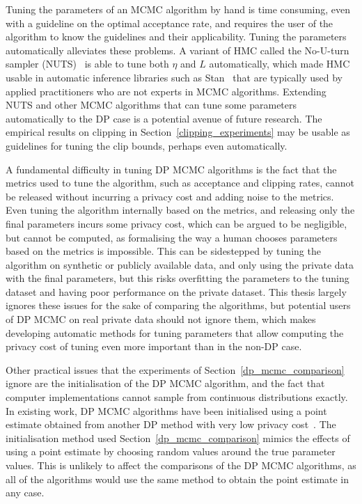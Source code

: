 \documentclass[english,twoside,openright]{HYgraduMLDS}
\begin{document}
Tuning the parameters of an MCMC algorithm by hand is time consuming,
even with a guideline on the optimal acceptance rate, and requires the user of
the algorithm to know the guidelines and their applicability. Tuning the
parameters automatically alleviates these problems. A variant of HMC called
the No-U-turn sampler (NUTS)~\cite{HoG14} is able to tune both \(\eta\) and \(L\)
automatically, which made HMC usable in automatic inference libraries such as
Stan~\cite{stan} that are typically used by applied practitioners who are not
experts in MCMC algorithms. Extending NUTS and other MCMC algorithms that
can tune some parameters automatically to the DP case is a potential avenue of
future research. The empirical results on clipping in
Section~\ref{clipping_experiments} may be usable as guidelines for tuning the
clip bounds, perhaps even automatically.

A fundamental difficulty in tuning DP MCMC algorithms is the fact that the
metrics used to tune the algorithm, such as acceptance and clipping rates,
cannot be released without incurring a privacy cost and adding noise to the
metrics. Even tuning the algorithm
internally based on the metrics, and releasing only the final parameters incurs
some privacy cost, which can be argued to be negligible, but cannot be
computed, as formalising the way a human chooses parameters based on the metrics
is impossible. This can be sidestepped by tuning the algorithm on synthetic or
publicly available data, and only using the private data with the final parameters,
but this risks overfitting the parameters to the tuning dataset and having
poor performance on the private dataset.
This thesis largely ignores these issues for the sake of comparing
the algorithms, but potential users of DP MCMC on real private data should not
ignore them, which makes developing automatic methods for tuning parameters
that allow computing the privacy cost of tuning
even more important than in the non-DP case.

Other practical issues that the experiments of Section~\ref{dp_mcmc_comparison}
ignore are the initialisation of the DP MCMC algorithm, and the fact that
computer implementations cannot sample from continuous distributions exactly.
In existing work, DP MCMC algorithms have been initialised using a point
estimate obtained from another DP method with very low privacy
cost~\cite{HeikkilaJDH19, WFS15}. The initialisation method used
Section~\ref{dp_mcmc_comparison} mimics the effects of using a point estimate by
choosing random values around the true parameter values. This is unlikely to
affect the comparisons of the DP MCMC algorithms, as all of the algorithms
would use the same method to obtain the point estimate in any case.
\end{document}
